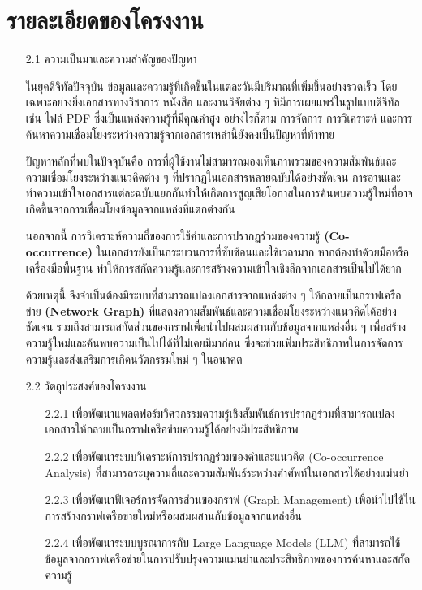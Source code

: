 \documentclass[12pt,a4paper]{article}
\newcommand{\textlight}[1]{{\thailightfont #1}}
\begin{document}
\section{รายละเอียดของโครงงาน}
\begin{enumerate}[leftmargin=2cm]
\small
    \item[2.1] ความเป็นมาและความสำคัญของปัญหา
    \vspace{0.35cm}
    \\
    \textlight{
        \hspace{1cm}ในยุคดิจิทัลปัจจุบัน ข้อมูลและความรู้ที่เกิดขึ้นในแต่ละวันมีปริมาณที่เพิ่มขึ้นอย่างรวดเร็ว โดยเฉพาะอย่างยิ่งเอกสารทางวิชาการ หนังสือ และงานวิจัยต่าง ๆ ที่มีการเผยแพร่ในรูปแบบดิจิทัล เช่น ไฟล์ PDF ซึ่งเป็นแหล่งความรู้ที่มีคุณค่าสูง อย่างไรก็ตาม การจัดการ การวิเคราะห์ และการค้นหาความเชื่อมโยงระหว่างความรู้จากเอกสารเหล่านี้ยังคงเป็นปัญหาที่ท้าทาย

        \hspace{1cm}ปัญหาหลักที่พบในปัจจุบันคือ การที่ผู้ใช้งานไม่สามารถมองเห็นภาพรวมของความสัมพันธ์และความเชื่อมโยงระหว่างแนวคิดต่าง ๆ ที่ปรากฏในเอกสารหลายฉบับได้อย่างชัดเจน การอ่านและทำความเข้าใจเอกสารแต่ละฉบับแยกกันทำให้เกิดการสูญเสียโอกาสในการค้นพบความรู้ใหม่ที่อาจเกิดขึ้นจากการเชื่อมโยงข้อมูลจากแหล่งที่แตกต่างกัน

        \hspace{1cm}นอกจากนี้ การวิเคราะห์ความถี่ของการใช้คำและการปรากฏร่วมของความรู้ \textbf{(Co-occurrence)} ในเอกสารยังเป็นกระบวนการที่ซับซ้อนและใช้เวลามาก หากต้องทำด้วยมือหรือเครื่องมือพื้นฐาน ทำให้การสกัดความรู้และการสร้างความเข้าใจเชิงลึกจากเอกสารเป็นไปได้ยาก

        \hspace{1cm}ด้วยเหตุนี้ จึงจำเป็นต้องมีระบบที่สามารถแปลงเอกสารจากแหล่งต่าง ๆ ให้กลายเป็นกราฟเครือข่าย \textbf{(Network Graph)} ที่แสดงความสัมพันธ์และความเชื่อมโยงระหว่างแนวคิดได้อย่างชัดเจน รวมถึงสามารถสกัดส่วนของกราฟเพื่อนำไปผสมผสานกับข้อมูลจากแหล่งอื่น ๆ เพื่อสร้างความรู้ใหม่และค้นพบความเป็นไปได้ที่ไม่เคยมีมาก่อน ซึ่งจะช่วยเพิ่มประสิทธิภาพในการจัดการความรู้และส่งเสริมการเกิดนวัตกรรมใหม่ ๆ ในอนาคต
    }

    \item[2.2] วัตถุประสงค์ของโครงงาน
    \vspace{0.05cm}
    \textlight{
        \begin{enumerate}
            \item[2.2.1] เพื่อพัฒนาแพลตฟอร์มวิศวกรรมความรู้เชิงสัมพันธ์การปรากฏร่วมที่สามารถแปลงเอกสารให้กลายเป็นกราฟเครือข่ายความรู้ได้อย่างมีประสิทธิภาพ
            \item[2.2.2] เพื่อพัฒนาระบบวิเคราะห์การปรากฏร่วมของคำและแนวคิด (Co-occurrence Analysis) ที่สามารถระบุความถี่และความสัมพันธ์ระหว่างคำศัพท์ในเอกสารได้อย่างแม่นยำ
            \item[2.2.3] เพื่อพัฒนาฟีเจอร์การจัดการส่วนของกราฟ (Graph Management) เพื่อนำไปใช้ในการสร้างกราฟเครือข่ายใหม่หรือผสมผสานกับข้อมูลจากแหล่งอื่น
            \item[2.2.4] เพื่อพัฒนาระบบบูรณาการกับ Large Language Models (LLM) ที่สามารถใช้ข้อมูลจากกราฟเครือข่ายในการปรับปรุงความแม่นยำและประสิทธิภาพของการค้นหาและสกัดความรู้
        \end{enumerate}
    }
    

\end{enumerate}
\end{document}

